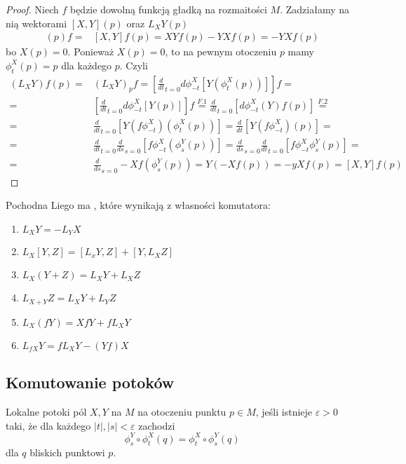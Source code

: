 \begin{proof}
    Niech $f$ będzie dowolną funkcją gładką na rozmaitości $M$. Zadziałamy na nią wektorami $[X,Y](p)$ oraz $L_XY(p)$
    \begin{align*}
      [X,Y](p)f=&[X,Y]f(p)=XYf(p)-YXf(p)=-YXf(p)
    \end{align*}
    bo $X(p)=0$. Ponieważ $X(p)=0$, to na pewnym otoczeniu $p$ mamy $\phi_t^X(p)=p$ dla każdego $p$. Czyli
    \begin{align*}
      (L_XY)f(p)=&(L_XY)_pf=\left[\frac{d}{dt}_{t=0}d\phi_{-t}^X[Y(\phi_t^X(p))]\right]f=\\
      =&\left[\frac{d}{dt}_{t=0}d\phi_{-t}^X[Y(p)]\right]f\overset{F.1}{=}\frac{d}{dt}_{t=0}[d\phi_{-t}^X(Y)f(p)]\overset{F.2}{=}\\
      =&\frac{d}{dt}_{t=0}\left[Y(f\phi_{-t}^X)(\phi_t^X(p))\right]=\frac{d}{dt}[Y(f\phi_{-t}^X)(p)]=\\
      =&\frac{d}{dt}_{t=0}\frac{d}{ds}_{s=0}[f\phi_{-t}^X(\phi_s^Y(p))]=\frac{d}{ds}_{s=0}\frac{d}{dt}_{t=0}[f\phi_{-t}^X\phi_s^Y(p)]=\\
      =&\frac{d}{ds}_{s=0}-Xf(\phi_s^Y(p))=Y(-Xf(p))=-yXf(p)=[X,Y]f(p)
    \end{align*}
  
\end{proof}

Pochodna Liego ma , które wynikają z własności komutatora:
\begin{multicols}{2}
\begin{enumerate}
  \item $L_XY=-L_YX$
  \item $L_X[Y,Z]=[L_xY,Z]+[Y,L_XZ]$ %
  \item $L_X(Y+Z)=L_XY+L_XZ$%
  \item $L_{X+Y}Z=L_XY+L_YZ$
  \item $L_X(fY)=XfY+fL_XY$
  \item $L_{fX}Y=fL_XY-(Yf)X$
\end{enumerate}
\end{multicols}

\subsection{Komutowanie potoków}

\begin{definition}
  Lokalne potoki pól $X,Y$ na $M$  na otoczeniu  punktu $p\in M$, jeśli istnieje $\varepsilon>0$ taki, że dla każdego $|t|,|s|<\varepsilon$ zachodzi
  $$\phi_s^Y\circ\phi_t^X(q)=\phi_t^X\circ\phi_s^Y(q)$$
  dla $q$ bliskich punktowi $p$.
\end{definition}


